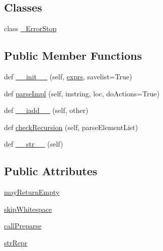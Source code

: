 \subsection*{Classes}
\begin{DoxyCompactItemize}
\item 
class \hyperlink{classpkg__resources_1_1__vendor_1_1pyparsing_1_1And_1_1__ErrorStop}{\+\_\+\+Error\+Stop}
\end{DoxyCompactItemize}
\subsection*{Public Member Functions}
\begin{DoxyCompactItemize}
\item 
def \hyperlink{classpkg__resources_1_1__vendor_1_1pyparsing_1_1And_a1b82c1bcfc776105763c4702e8986bea}{\+\_\+\+\_\+init\+\_\+\+\_\+} (self, \hyperlink{classpkg__resources_1_1__vendor_1_1pyparsing_1_1ParseExpression_ae9e07a06d183190717e964e7ff907363}{exprs}, savelist=True)
\item 
def \hyperlink{classpkg__resources_1_1__vendor_1_1pyparsing_1_1And_ac32523c030626202dde8714f0fe3a092}{parse\+Impl} (self, instring, loc, do\+Actions=True)
\item 
def \hyperlink{classpkg__resources_1_1__vendor_1_1pyparsing_1_1And_aab46d1c623b48f6b5556975df8b97aba}{\+\_\+\+\_\+iadd\+\_\+\+\_\+} (self, other)
\item 
def \hyperlink{classpkg__resources_1_1__vendor_1_1pyparsing_1_1And_afb57cdf369ab2c8b6410420ab31990ad}{check\+Recursion} (self, parse\+Element\+List)
\item 
def \hyperlink{classpkg__resources_1_1__vendor_1_1pyparsing_1_1And_a5bf261fd6d3b258fffd8bc8fdaba40eb}{\+\_\+\+\_\+str\+\_\+\+\_\+} (self)
\end{DoxyCompactItemize}
\subsection*{Public Attributes}
\begin{DoxyCompactItemize}
\item 
\hyperlink{classpkg__resources_1_1__vendor_1_1pyparsing_1_1And_aba58fe973f21ac96599ac331a0b3aad1}{may\+Return\+Empty}
\item 
\hyperlink{classpkg__resources_1_1__vendor_1_1pyparsing_1_1And_a0f47b9ca84f6db58d94518eb7915025c}{skip\+Whitespace}
\item 
\hyperlink{classpkg__resources_1_1__vendor_1_1pyparsing_1_1And_a8c7a814824b65bf36e6b56e11dc19545}{call\+Preparse}
\item 
\hyperlink{classpkg__resources_1_1__vendor_1_1pyparsing_1_1And_a47534db1df0f80837e6a0692e273baf8}{str\+Repr}
\end{DoxyCompactItemize}
